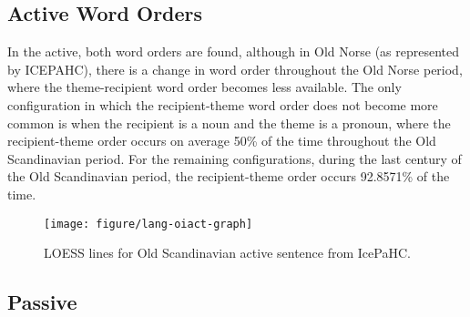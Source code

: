 \subsection{Active Word Orders}
In the active, both word orders are found, although in Old Norse (as represented by ICEPAHC), there is a change in word order throughout the Old Norse period, where the theme-recipient word order becomes less available. The only configuration in which the recipient-theme word order does not become more common is when the recipient is a noun and the theme is a pronoun, where the recipient-theme order occurs on average  50\% of the time throughout the Old Scandinavian period. For the remaining configurations, during the last century of the Old Scandinavian period, the recipient-theme order occurs 92.8571\% of the time.

\begin{knitrout}
\color{fgcolor}\begin{figure}[p!]


{\centering \texttt{[image: figure/lang-oiact-graph]} 

}

\caption[LOESS lines for Old Scandinavian active sentence from IcePaHC]{LOESS lines for Old Scandinavian active sentence from IcePaHC.\label{fig:oldscanactgraph}\label{fig:oiact-graph}}
\end{figure}


\end{knitrout}

\subsection{Passive}
